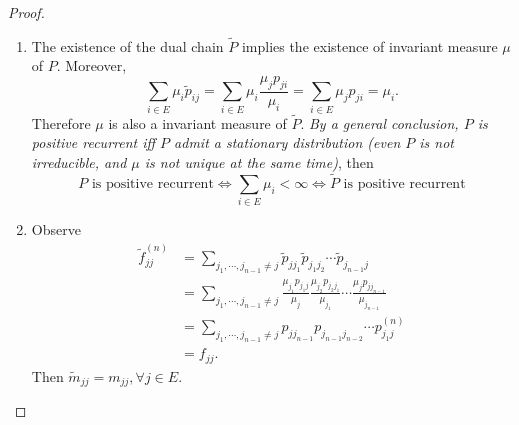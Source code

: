 \documentclass[12pt]{article}
\renewcommand{\(}{\left(}%
\renewcommand{\)}{\right)}%
\renewcommand{\[}{\left[}%
\renewcommand{\]}{\right]}%
\renewcommand{\d}{\mathrm{d}}
\newcommand{\n}{\mathbb{N}}
\newcommand{\li}{\lim\limits_}
\newtheorem{proof}{Proof.}}
\begin{document}
\begin{proof}
\begin{enumerate}
\begin{enumerate}
   \begin{equation*}
    \widetilde{ P}_{jj}(1)=\sum_{n=0}^\infty \widetilde{p}_{jj}^{(n)}=\sum_{n=0}^\infty p_{jj}^{(n)}=P_{jj}(1)
   \end{equation*}
   $\forall \{s_n\}_{n\in\n},$ and $s_n\uparrow 1 $, we have
   \begin{equation*}
    \begin{split}
     \widetilde{ m}_{jj}&=\li{n\to\infty}\(\left.\frac{\d }{\d s} \widetilde{ F}_{jj}(s)\right|_{s=s_n}\)=\li{n\to\infty} \[\frac{\d }{\d s}\left.\(1-\frac{1}{\widetilde{P}_{jj}(s)} \)\right|_{s=s_n}\]\\
     &=\li{n\to\infty} \[\frac{\d }{\d s}\left.\(1-\frac{1}{P_{jj}(s)} \)\right|_{s=s_n}\]=\li{n\to\infty}\(\left.\frac{\d }{\d s}  F_{jj}(s)\right|_{s=s_n}\)=m_{jj}
    \end{split}
   \end{equation*}
   So $P$ is positive recurrent if and only if $\widetilde{P}$ is positive recurrent.
   \item The existence of the dual chain $\widetilde{P}$ implies the existence of invariant measure $\mu$ of $P$. Moreover, 
   \begin{equation*}
   	\sum_{i\in E}\mu_i\widetilde{p}_{ij}=\sum_{i\in E}\mu_i\frac{\mu_jp_{ji}}{\mu_i}=\sum_{i\in E}\mu_jp_{ji}=\mu_i.
   \end{equation*}
   Therefore $\mu$ is also a invariant measure of $\widetilde{P}$. {\itshape By a general conclusion, $P$ is positive recurrent iff $P$ admit a stationary distribution (even $P$ is not irreducible, and $\mu$ is not unique at the same time)}, then 
   \begin{equation*}
   	P \text{ is positive recurrent}\Leftrightarrow \sum_{i\in E}\mu_i<\infty\Leftrightarrow \widetilde{P}  \text{ is positive recurrent}
   \end{equation*}
   \item Observe
   \begin{equation*}
   	\begin{split}
   		\widetilde{ f}_{jj}^{(n)}&=\sum_{j_1,\cdots,j_{n-1}\neq j}\widetilde{p}_{jj_1}\widetilde{p}_{j_1j_2}\cdots \widetilde{p}_{j_{n-1}j}\\
   		&=\sum_{j_1,\cdots,j_{n-1}\neq j}\frac{\mu_{j_1}p_{j_1j}}{\mu_j} \frac{\mu_{j_2}p_{j_2j_1}}{\mu_{j_1}}\cdots \frac{\mu_jp_{jj_{n-1}}}{\mu_{j_{n-1}}}\\
   		&=\sum_{j_1,\cdots,j_{n-1}\neq j}p_{jj_{n-1}}p_{j_{n-1}j_{n-2}}\cdots p_{j_{1}j}^{(n)}\\
   		&=f_{jj}.
   	\end{split}
   \end{equation*}
   Then $\widetilde{m}_{jj}=m_{jj},\forall j\in E$.
   \end{enumerate}
  \end{enumerate}
 \end{proof}
 
\end{document}
